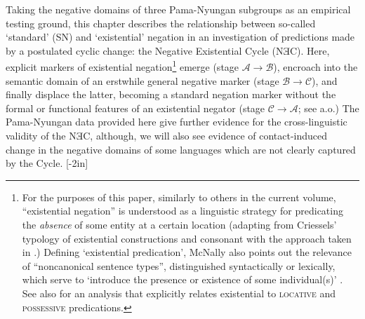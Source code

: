 Taking the negative domains of three Pama-Nyungan subgroups as an empirical testing ground, this chapter describes the relationship between so-called `standard' (SN) and `existential' negation in an investigation of predictions made by a postulated cyclic change: the Negative Existential Cycle (NƎC). Here, explicit markers of existential negation\footnote{For the purposes of this paper, similarly to others in the current volume, ``existential negation'' is understood as a linguistic strategy for predicating the \textit{absence} of some entity at a certain location (adapting from Criessels' \citeyearpar[2]{Creissels2014} typology of existential constructions and consonant with the approach taken in \citealp[139]{Veselinova2013}.) Defining `existential predication', McNally also points out the relevance of ``noncanonical sentence types'', distinguished syntactically or lexically, which serve to `introduce the presence or existence of some individual(s)' \citeyearpar[210]{McNally2016}. See also \citealt{Freeze1992} for an analysis that explicitly relates existential to \textsc{locative} and \textsc{possessive} predications.} emerge (stage $\mathcal{A\to B}$), encroach into the semantic domain of an erstwhile general negative marker (stage $\mathcal{B\to C}$), and finally displace the latter, becoming a standard negation marker without the formal or functional features of an existential negator (stage $\mathcal{C\to A}$; see \citealt{Croft1991,Veselinova2016} a.o.) The Pama-Nyungan data provided here give further evidence for the cross-linguistic validity of the NƎC, although, we will also see evidence of contact-induced change in the negative domains of some languages which are not clearly captured by the Cycle.
[-2in]


